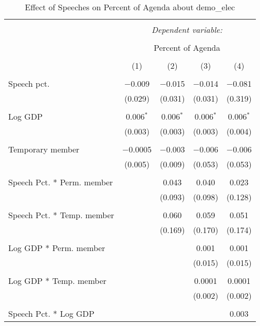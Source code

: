 
\begin{table}[!htbp] \centering 
  \caption{Effect of Speeches on Percent of Agenda about  demo_elec} 
  \label{} 
\begin{tabular}{@{\extracolsep{5pt}}lcccc} 
\\[-1.8ex]\hline 
\hline \\[-1.8ex] 
 & \multicolumn{4}{c}{\textit{Dependent variable:}} \\ 
\cline{2-5} 
\\[-1.8ex] & \multicolumn{4}{c}{Percent of Agenda} \\ 
\\[-1.8ex] & (1) & (2) & (3) & (4)\\ 
\hline \\[-1.8ex] 
 Speech pct. & $-$0.009 & $-$0.015 & $-$0.014 & $-$0.081 \\ 
  & (0.029) & (0.031) & (0.031) & (0.319) \\ 
  & & & & \\ 
 Log GDP & 0.006$^{*}$ & 0.006$^{*}$ & 0.006$^{*}$ & 0.006$^{*}$ \\ 
  & (0.003) & (0.003) & (0.003) & (0.004) \\ 
  & & & & \\ 
 Temporary member & $-$0.0005 & $-$0.003 & $-$0.006 & $-$0.006 \\ 
  & (0.005) & (0.009) & (0.053) & (0.053) \\ 
  & & & & \\ 
 Speech Pct. * Perm. member &  & 0.043 & 0.040 & 0.023 \\ 
  &  & (0.093) & (0.098) & (0.128) \\ 
  & & & & \\ 
 Speech Pct. * Temp. member &  & 0.060 & 0.059 & 0.051 \\ 
  &  & (0.169) & (0.170) & (0.174) \\ 
  & & & & \\ 
 Log GDP * Perm. member &  &  & 0.001 & 0.001 \\ 
  &  &  & (0.015) & (0.015) \\ 
  & & & & \\ 
 Log GDP * Temp. member &  &  & 0.0001 & 0.0001 \\ 
  &  &  & (0.002) & (0.002) \\ 
  & & & & \\ 
 Speech Pct. * Log GDP &  &  &  & 0.003 \\ 

\end{tabular}
\end{table}

